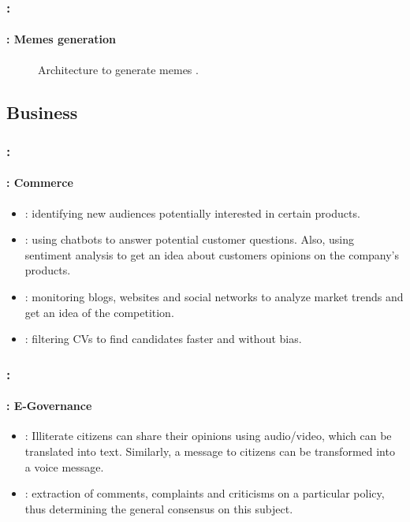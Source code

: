 \documentclass[xcolor=table]{beamer}
\begin{document}
\begin{frame}
	\frametitle{\insertshortsubtitle: \insertsection}
	\framesubtitle{\insertsubsection: Memes generation}

	\begin{figure}
		\centering
		\caption{Architecture to generate memes \cite{sadasivam2020memebot}.}
	\end{figure}

\end{frame}


\subsection{Business}

\begin{frame}
	\frametitle{\insertshortsubtitle: \insertsection}
	\framesubtitle{\insertsubsection: Commerce}

	\begin{itemize}
		\item {}: identifying new audiences potentially interested in certain products.
		\item {}: using chatbots to answer potential customer questions.
		Also, using sentiment analysis to get an idea about customers opinions on the company's products.
		\item {}: monitoring blogs, websites and social networks to analyze market trends and get an idea of the competition.
		\item {}: filtering CVs to find candidates faster and without bias.
	\end{itemize}

\end{frame}

\begin{frame}
	\frametitle{\insertshortsubtitle: \insertsection}
	\framesubtitle{\insertsubsection: E-Governance}

	\begin{itemize}
		\item {}: Illiterate citizens can share their opinions using audio/video, which can be translated into text. Similarly, a message to citizens can be transformed into a voice message.
		\item {}: extraction of comments, complaints and criticisms on a particular policy, thus determining the general consensus on this subject.
	\end{itemize}

\end{frame}
\end{document}
